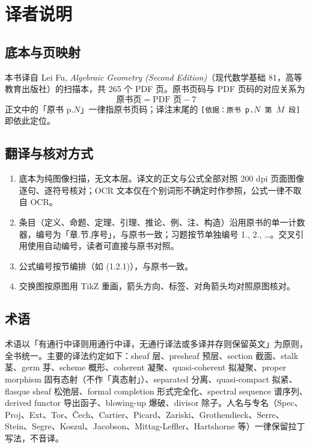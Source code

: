 \section*{译者说明}

\subsection*{底本与页映射}

本书译自 Lei Fu, \emph{Algebraic Geometry (Second Edition)}（现代数学基础 81，高等教育出版社）的扫描本，共 265 个 PDF 页。原书页码与 PDF 页码的对应关系为
\[
\text{原书页} = \text{PDF 页} - 7
\]
正文中的「原书 p.$N$」一律指原书页码；译注末尾的 \texttt{[依据：原书 p.$N$ 第 $M$ 段]} 即依此定位。

\subsection*{翻译与核对方式}

\begin{enumerate}[label=(\arabic*),leftmargin=2.4em]
  \item 底本为纯图像扫描，无文本层。译文的正文与公式全部对照 200 dpi 页面图像逐句、逐符号核对；OCR 文本仅在个别词形不确定时作参照，公式一律不取自 OCR。
  \item 条目（定义、命题、定理、引理、推论、例、注、构造）沿用原书的单一计数器，编号为「章.节.序号」，与原书一致；习题按节单独编号 1., 2., \ldots。交叉引用使用自动编号，读者可直接与原书对照。
  \item 公式编号按节编排（如 (1.2.1)），与原书一致。
  \item 交换图按原图用 TikZ 重画，箭头方向、标签、对角箭头均对照原图核对。
\end{enumerate}

\subsection*{术语}

术语以「有通行中译则用通行中译，无通行译法或多译并存则保留英文」为原则，全书统一。主要的译法约定如下：sheaf 层、presheaf 预层、section 截面、stalk 茎、germ 芽、scheme 概形、coherent 凝聚、quasi-coherent 拟凝聚、proper morphism 固有态射（不作「真态射」）、separated 分离、quasi-compact 拟紧、flasque sheaf 松弛层、formal completion 形式完全化、spectral sequence 谱序列、derived functor 导出函子、blowing-up 爆破、divisor 除子。人名与专名（Spec、Proj、Ext、Tor、Čech、Cartier、Picard、Zariski、Grothendieck、Serre、Stein、Segre、Koszul、Jacobson、Mittag-Leffler、Hartshorne 等）一律保留拉丁写法，不音译。

